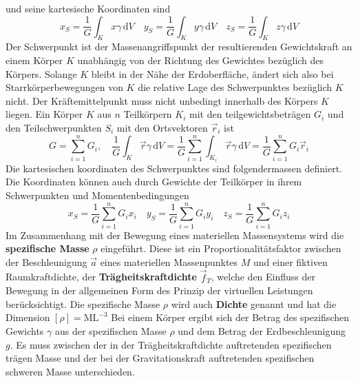 und seine kartesische Koordinaten sind
\begin{equation}
\boxed{x_S=\dfrac{1}{G}\displaystyle \int_Kx\gamma\,\text{d}V}\quad \boxed{y_S=\dfrac{1}{G}\displaystyle \int_Ky\gamma\,\text{d}V}\quad \boxed{z_S=\dfrac{1}{G}\displaystyle \int_Kz\gamma\,\text{d}V}
\end{equation}
Der Schwerpunkt ist der Massenangriffspunkt der resultierenden Gewichtskraft an einem Körper $K$ unabhängig von der Richtung des Gewichtes bezüglich des Körpers. Solange $K$ bleibt in der Nähe der Erdoberfläche, ändert sich also bei Starrkörperbewegungen von $K$ die relative Lage des Schwerpunktes bezüglich $K$ nicht. Der Kräftemittelpunkt muss nicht unbedingt innerhalb des Körpers $K$ liegen.
\newline\newline
Ein Körper $K$ aus $n$ Teilkörpern $K_i$ mit den teilgewichtsbeträgen $G_i$ und den Teilschwerpunkten $S_i$ mit den Ortsvektoren $\overrightarrow{r}_i$ ist
\begin{equation}
\boxed{G=\displaystyle \sum_{i=1}^nG_i},\quad \boxed{\dfrac{1}{G}\displaystyle \int_K\overrightarrow{r}\gamma\,\text{d}V=\dfrac{1}{G}\displaystyle \sum_{i=1}^{n}\int_{K_i}\overrightarrow{r}\gamma\,\text{d}V=\dfrac{1}{G}\displaystyle \sum_{i=1}^nG_i\overrightarrow{r}_i}
\end{equation}
Die kartesischen koordinaten des Schwerpunktes sind folgendermassen definiert. Die Koordinaten können auch durch Gewichte der Teilkörper in ihrem Schwerpunkten und Momentenbedingungen
\begin{equation}
\boxed{x_S=\dfrac{1}{G}\displaystyle \sum_{i=1}^nG_ix_i}\quad \boxed{y_S=\dfrac{1}{G}\displaystyle \sum_{i=1}^nG_iy_i}\quad \boxed{z_S=\dfrac{1}{G}\displaystyle \sum_{i=1}^nG_iz_i}
\end{equation}
Im Zusammenhang mit der Bewegung eines materiellen Massensystems wird die \textbf{spezifische Masse} $\rho$ eingeführt. Diese ist ein Proportionalitätsfaktor zwischen der Beschleunigung $\overrightarrow{a}$ eines materiellen Massenpunktes $M$ und einer fiktiven Raumkraftdichte, der \textbf{Trägheitskraftdichte} $\overrightarrow{f}_T$, welche den Einfluss der Bewegung in der allgemeinen Form des Prinzip der virtuellen Leistungen berücksichtigt. Die spezifische Masse $\rho$ wird auch \textbf{Dichte} genannt und hat die Dimension $\left[\rho\right]=\text{ML}^{-3}$ 
\newline\newline
Bei einem Körper ergibt sich der Betrag des spezifischen Gewichts $\gamma$ aus der spezifischen Masse $\rho$ und dem Betrag der Erdbeschleunigung $g$. Es muss zwischen der in der Trägheitskraftdichte auftretenden spezifischen trägen Masse und der bei der Gravitationskraft auftretenden spezifischen schweren Masse unterschieden.

